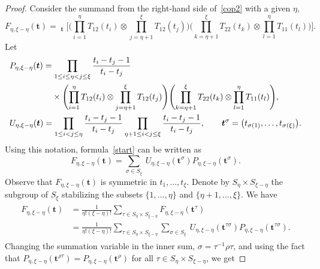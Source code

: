 \documentclass[pdftex]{sigma}
\numberwithin{equation}{section}
\DeclareMathOperator{\Symb}{\overline{Sym} }
\begin{document}
\begin{proof}
Consider the summand from the right-hand side of~\eqref{cop2} with a given $\eta$,
\begin{equation} \label{start}
F_{\eta,\xi-\eta}(\boldsymbol{t})= \Symb_{\boldsymbol{t}}\Biggl[ \Biggl(\prod_{i=1}^{\eta} T_{12} (t_i) \otimes \prod_{j=\eta+1}^{\xi } T_{12} (t_j) \Biggr)
\Biggl(\prod_{k=\eta+1}^{\xi } T _{22}(t_{k})\otimes \prod_{l=1}^{\eta} T _{11}(t_l)\Biggr) \Biggr].
\end{equation}
Let
\begin{align*}
&P_{\eta,\xi-\eta} (\boldsymbol{t})= \prod_{1\leq i\leq\eta<j \leq \xi} \frac{t_i-t_j-1}{t_i-t_j}\\
& \hphantom{P_{\eta,\xi-\eta} (\boldsymbol{t})=}{}\times{}\Biggl(\prod_{i=1}^{\eta} T_{12} (t_i) \otimes \prod_{j=\eta+1}^{\xi } T_{12} (t_j) \Biggr) \Biggl(\prod_{k=\eta+1}^{\xi } T _{22}(t_{k})\otimes \prod_{l=1}^{\eta} T _{11}(t_l)\Biggr),\\
& U_{\eta,\xi-\eta}(\boldsymbol{t})= \prod_{1\leq i<j\leq \eta} \frac{t_{i}-t_{j}-1}{t_{i}-t_{j}} \prod_{\eta+1\leq i<j\leq \xi} \frac{t_{i}-t_{j}-1}{t_{i}-t_{j}}, \qquad
 \boldsymbol{t}^\sigma=\bigl(t_{\sigma(1)},\dots,t_{\sigma(\xi)}\bigr).
\end{align*}
Using this notation, formula~\eqref{start} can be written as
\begin{equation*}%
F_{\eta,\xi-\eta}(\boldsymbol{t})=\sum_{\sigma\in S_\xi}\ U_{\eta,\xi-\eta}(\boldsymbol{t}^\sigma) P_{\eta,\xi-\eta}(\boldsymbol{t}^\sigma).
\end{equation*}
Observe that $ F_{\eta,\xi-\eta}(\boldsymbol{t})$ is symmetric in $t_1,\dots,t_\xi$.
Denote by $S_\eta \times S_{\xi-\eta} $ the subgroup of $S_\xi$ stabilizing the subsets $\{1,\dots,\eta\}$ and $\{\eta+1,\dots,\xi\}$. We have
\begin{align*}%
\begin{split}
F_{\eta,\xi-\eta}(\boldsymbol{t})&{}=\frac{1}{\eta!(\xi-\eta)!} \sum_{\tau\in S_\eta\times S_{\xi-\eta}} F_{\eta,\xi-\eta}(\boldsymbol{t}^\tau)\\
&{}=\frac{1}{\eta!(\xi-\eta)!} \sum_{\tau\in S_\eta\times S_{\xi-\eta}} \sum_{\sigma\in S_\xi}\ U_{\eta,\xi-\eta}(\boldsymbol{t}^{\tau\sigma}) P_{\eta,\xi-\eta}(\boldsymbol{t}^{\tau\sigma}).
\end{split}
\end{align*}
Changing the summation variable in the inner sum, $\sigma=\tau^{-1}\rho\tau$, and using the fact that $P_{\eta,\xi-\eta}(\boldsymbol{t}^{\rho\tau})=P_{\eta,\xi-\eta}(\boldsymbol{t}^{\rho})$ for all $\tau \in S_\eta\times S_{\xi-\eta}$, we get

\end{proof}
\end{document}
